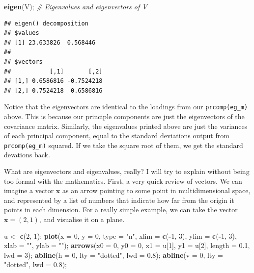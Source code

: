 \documentclass[]{article}
\newenvironment{Shaded}{\begin{snugshade}}{\end{snugshade}}
\newcommand{\CommentTok}[1]{\textcolor[rgb]{0.56,0.35,0.01}{\textit{#1}}}
\newcommand{\DataTypeTok}[1]{\textcolor[rgb]{0.13,0.29,0.53}{#1}}
\newcommand{\DecValTok}[1]{\textcolor[rgb]{0.00,0.00,0.81}{#1}}
\newcommand{\FloatTok}[1]{\textcolor[rgb]{0.00,0.00,0.81}{#1}}
\newcommand{\KeywordTok}[1]{\textcolor[rgb]{0.13,0.29,0.53}{\textbf{#1}}}
\newcommand{\NormalTok}[1]{#1}
\newcommand{\OperatorTok}[1]{\textcolor[rgb]{0.81,0.36,0.00}{\textbf{#1}}}
\newcommand{\StringTok}[1]{\textcolor[rgb]{0.31,0.60,0.02}{#1}}
\begin{document}
\begin{Shaded}
\begin{Highlighting}[]
\KeywordTok{eigen}\NormalTok{(V); }\CommentTok{# Eigenvalues and eigenvectors of V}
\end{Highlighting}
\end{Shaded}

\begin{verbatim}
## eigen() decomposition
## $values
## [1] 23.633826  0.568446
## 
## $vectors
##           [,1]       [,2]
## [1,] 0.6586816 -0.7524218
## [2,] 0.7524218  0.6586816
\end{verbatim}

Notice that the eigenvectors are identical to the loadings from our
\texttt{prcomp(eg\_m)} above. This is because our principle components
are just the eigenvectors of the covariance matrix. Similarly, the
eigenvalues printed above are just the variances of each principal
component, equal to the standard deviations output from
\texttt{prcomp(eg\_m)} squared. If we take the square root of them, we
get the standard devations back.

What are eigenvectors and eigenvalues, really? I will try to explain
without being too formal with the mathematics. First, a very quick
review of vectors. We can imagine a vector \(\textbf{x}\) as an arrow
pointing to some point in multidimensional space, and represented by a
list of numbers that indicate how far from the origin it points in each
dimension. For a really simple example, we can take the vector
\(\textbf{x} = (2, 1)\), and visualise it on a plane.

\begin{Shaded}
\begin{Highlighting}[]
\NormalTok{u <-}\StringTok{ }\KeywordTok{c}\NormalTok{(}\DecValTok{2}\NormalTok{, }\DecValTok{1}\NormalTok{);}
\KeywordTok{plot}\NormalTok{(}\DataTypeTok{x =} \DecValTok{0}\NormalTok{, }\DataTypeTok{y =} \DecValTok{0}\NormalTok{, }\DataTypeTok{type =} \StringTok{"n"}\NormalTok{, }\DataTypeTok{xlim =} \KeywordTok{c}\NormalTok{(}\OperatorTok{-}\DecValTok{1}\NormalTok{, }\DecValTok{3}\NormalTok{), }\DataTypeTok{ylim =} \KeywordTok{c}\NormalTok{(}\OperatorTok{-}\DecValTok{1}\NormalTok{, }\DecValTok{3}\NormalTok{), }\DataTypeTok{xlab =} \StringTok{""}\NormalTok{,}
     \DataTypeTok{ylab =} \StringTok{""}\NormalTok{);}
\KeywordTok{arrows}\NormalTok{(}\DataTypeTok{x0 =} \DecValTok{0}\NormalTok{, }\DataTypeTok{y0 =} \DecValTok{0}\NormalTok{, }\DataTypeTok{x1 =}\NormalTok{ u[}\DecValTok{1}\NormalTok{], }\DataTypeTok{y1 =}\NormalTok{ u[}\DecValTok{2}\NormalTok{], }\DataTypeTok{length =} \FloatTok{0.1}\NormalTok{, }\DataTypeTok{lwd =} \DecValTok{3}\NormalTok{);}
\KeywordTok{abline}\NormalTok{(}\DataTypeTok{h =} \DecValTok{0}\NormalTok{, }\DataTypeTok{lty =} \StringTok{"dotted"}\NormalTok{, }\DataTypeTok{lwd =} \FloatTok{0.8}\NormalTok{);}
\KeywordTok{abline}\NormalTok{(}\DataTypeTok{v =} \DecValTok{0}\NormalTok{, }\DataTypeTok{lty =} \StringTok{"dotted"}\NormalTok{, }\DataTypeTok{lwd =} \FloatTok{0.8}\NormalTok{);}
\end{Highlighting}
\end{Shaded}
\end{document}

